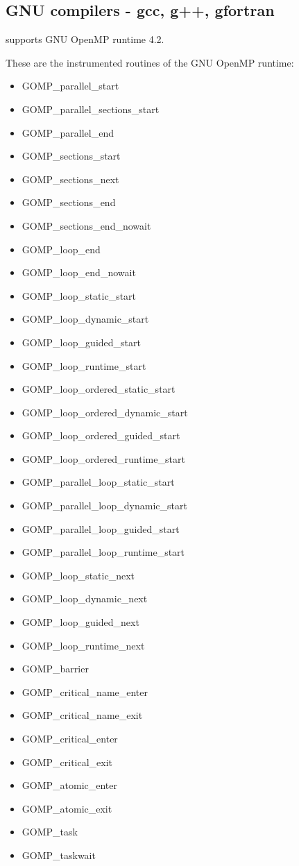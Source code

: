 \subsection{GNU compilers - gcc, g++, gfortran}

\TRACE supports GNU OpenMP runtime 4.2.

These are the instrumented routines of the GNU OpenMP runtime:

\begin{itemize}
\item GOMP\_parallel\_start
\item GOMP\_parallel\_sections\_start
\item GOMP\_parallel\_end
\item GOMP\_sections\_start
\item GOMP\_sections\_next
\item GOMP\_sections\_end
\item GOMP\_sections\_end\_nowait
\item GOMP\_loop\_end
\item GOMP\_loop\_end\_nowait
\item GOMP\_loop\_static\_start
\item GOMP\_loop\_dynamic\_start
\item GOMP\_loop\_guided\_start
\item GOMP\_loop\_runtime\_start
\item GOMP\_loop\_ordered\_static\_start
\item GOMP\_loop\_ordered\_dynamic\_start
\item GOMP\_loop\_ordered\_guided\_start
\item GOMP\_loop\_ordered\_runtime\_start
\item GOMP\_parallel\_loop\_static\_start
\item GOMP\_parallel\_loop\_dynamic\_start
\item GOMP\_parallel\_loop\_guided\_start
\item GOMP\_parallel\_loop\_runtime\_start
\item GOMP\_loop\_static\_next
\item GOMP\_loop\_dynamic\_next
\item GOMP\_loop\_guided\_next
\item GOMP\_loop\_runtime\_next
\item GOMP\_barrier
\item GOMP\_critical\_name\_enter\footnotemark[4]
\item GOMP\_critical\_name\_exit\footnotemark[4]
\item GOMP\_critical\_enter\footnotemark[4]
\item GOMP\_critical\_exit\footnotemark[4]
\item GOMP\_atomic\_enter\footnotemark[4]
\item GOMP\_atomic\_exit\footnotemark[4]
\item GOMP\_task
\item GOMP\_taskwait
\end{itemize}

